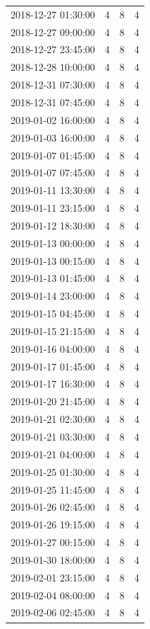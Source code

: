 \begin{tabular}{lrrr}
2018-12-27 01:30:00 & 4 & 8 & 4 \\
2018-12-27 09:00:00 & 4 & 8 & 4 \\
2018-12-27 23:45:00 & 4 & 8 & 4 \\
2018-12-28 10:00:00 & 4 & 8 & 4 \\
2018-12-31 07:30:00 & 4 & 8 & 4 \\
2018-12-31 07:45:00 & 4 & 8 & 4 \\
2019-01-02 16:00:00 & 4 & 8 & 4 \\
2019-01-03 16:00:00 & 4 & 8 & 4 \\
2019-01-07 01:45:00 & 4 & 8 & 4 \\
2019-01-07 07:45:00 & 4 & 8 & 4 \\
2019-01-11 13:30:00 & 4 & 8 & 4 \\
2019-01-11 23:15:00 & 4 & 8 & 4 \\
2019-01-12 18:30:00 & 4 & 8 & 4 \\
2019-01-13 00:00:00 & 4 & 8 & 4 \\
2019-01-13 00:15:00 & 4 & 8 & 4 \\
2019-01-13 01:45:00 & 4 & 8 & 4 \\
2019-01-14 23:00:00 & 4 & 8 & 4 \\
2019-01-15 04:45:00 & 4 & 8 & 4 \\
2019-01-15 21:15:00 & 4 & 8 & 4 \\
2019-01-16 04:00:00 & 4 & 8 & 4 \\
2019-01-17 01:45:00 & 4 & 8 & 4 \\
2019-01-17 16:30:00 & 4 & 8 & 4 \\
2019-01-20 21:45:00 & 4 & 8 & 4 \\
2019-01-21 02:30:00 & 4 & 8 & 4 \\
2019-01-21 03:30:00 & 4 & 8 & 4 \\
2019-01-21 04:00:00 & 4 & 8 & 4 \\
2019-01-25 01:30:00 & 4 & 8 & 4 \\
2019-01-25 11:45:00 & 4 & 8 & 4 \\
2019-01-26 02:45:00 & 4 & 8 & 4 \\
2019-01-26 19:15:00 & 4 & 8 & 4 \\
2019-01-27 00:15:00 & 4 & 8 & 4 \\
2019-01-30 18:00:00 & 4 & 8 & 4 \\
2019-02-01 23:15:00 & 4 & 8 & 4 \\
2019-02-04 08:00:00 & 4 & 8 & 4 \\
2019-02-06 02:45:00 & 4 & 8 & 4 \\

\end{tabular}
